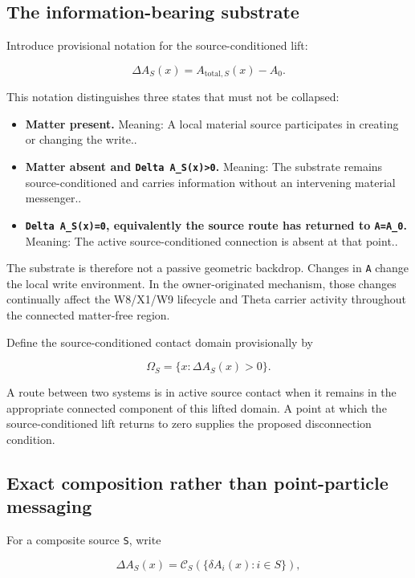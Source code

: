 \subsection{The information-bearing
substrate}\label{viii-ch12-the-information-bearing-substrate}

Introduce provisional notation for the source-conditioned lift:

\[
\Delta A_S(x)=A_{\mathrm{total},S}(x)-A_0.
\]

This notation distinguishes three states that must not be collapsed:

\begin{itemize}
\tightlist
\item
  \textbf{Matter present.} Meaning: A local material source participates
  in creating or changing the write..
\item
  \textbf{Matter absent and \texttt{Delta\ A\_S(x)\textgreater{}0}.}
  Meaning: The substrate remains source-conditioned and carries
  information without an intervening material messenger..
\item
  \textbf{\texttt{Delta\ A\_S(x)=0}, equivalently the source route has
  returned to \texttt{A=A\_0}.} Meaning: The active source-conditioned
  connection is absent at that point..
\end{itemize}

The substrate is therefore not a passive geometric backdrop. Changes in
\texttt{A} change the local write environment. In the owner-originated
mechanism, those changes continually affect the W8/X1/W9 lifecycle and
Theta carrier activity throughout the connected matter-free region.

Define the source-conditioned contact domain provisionally by

\[
\Omega_S=\{x:\Delta A_S(x)>0\}.
\]

A route between two systems is in active source contact when it remains
in the appropriate connected component of this lifted domain. A point at
which the source-conditioned lift returns to zero supplies the proposed
disconnection condition.

\subsection{Exact composition rather than point-particle
messaging}\label{viii-ch12-exact-composition-rather-than-point-particle-messaging}

For a composite source \texttt{S}, write

\[
\Delta A_S(x)
=
\mathcal C_S\!\left(\{\delta A_i(x):i\in S\}\right),
\]

